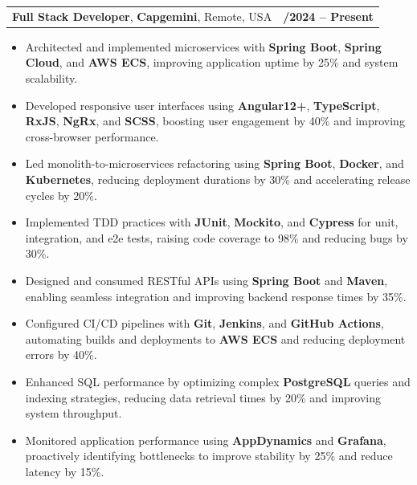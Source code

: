 \documentclass[letterpaper,11pt]{article}
\makeatletter
\newcommand{\resumeItem}[1]{
  \item\footnotesize{
    {#1 \vspace{-2pt}}
  }
}
\newcommand{\resumeSubheading}[4]{
  \vspace{-2pt}\item
    \begin{tabular*}{1.0\textwidth}[t]{l@{\extracolsep{\fill}}r}
      \textbf{\fontsize{10pt}{14pt}\selectfont #3}, \textbf{\fontsize{10pt}{14pt}\selectfont #1}, \fontsize{10pt}{14pt}\selectfont #4 & \textbf{\fontsize{10pt}{14pt}\selectfont #2} \\
    \end{tabular*}\vspace{-7pt}
}
\newcommand{\resumeItemListStart}{\begin{itemize}[leftmargin=*]}
\newcommand{\resumeItemListEnd}{\end{itemize}\vspace{-5pt}}
\makeatother
\begin{document}
    \resumeSubheading
        {Capgemini}{01/2024 -- Present}
        {Full Stack Developer}{Remote, USA}
      \resumeItemListStart
        \resumeItem{Architected and implemented microservices with \textbf{Spring Boot}, \textbf{Spring Cloud}, and \textbf{AWS ECS}, improving application uptime by 25\% and system scalability.}
        \resumeItem{Developed responsive user interfaces using \textbf{Angular12+}, \textbf{TypeScript}, \textbf{RxJS}, \textbf{NgRx}, and \textbf{SCSS}, boosting user engagement by 40\% and improving cross-browser performance.}
        \resumeItem{Led monolith-to-microservices refactoring using \textbf{Spring Boot}, \textbf{Docker}, and \textbf{Kubernetes}, reducing deployment durations by 30\% and accelerating release cycles by 20\%.}
        \resumeItem{Implemented TDD practices with \textbf{JUnit}, \textbf{Mockito}, and \textbf{Cypress} for unit, integration, and e2e tests, raising code coverage to 98\% and reducing bugs by 30\%.}
        \resumeItem{Designed and consumed RESTful APIs using \textbf{Spring Boot} and \textbf{Maven}, enabling seamless integration and improving backend response times by 35\%.}
        \resumeItem{Configured CI/CD pipelines with \textbf{Git}, \textbf{Jenkins}, and \textbf{GitHub Actions}, automating builds and deployments to \textbf{AWS ECS} and reducing deployment errors by 40\%.}
        \resumeItem{Enhanced SQL performance by optimizing complex \textbf{PostgreSQL} queries and indexing strategies, reducing data retrieval times by 20\% and improving system throughput.}
        \resumeItem{Monitored application performance using \textbf{AppDynamics} and \textbf{Grafana}, proactively identifying bottlenecks to improve stability by 25\% and reduce latency by 15\%.}
      \resumeItemListEnd
\end{document}
